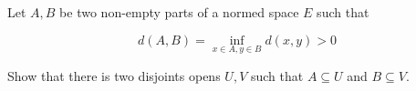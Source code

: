 Let $A, B$ be two non-empty parts of a normed space $E$ such that

\[d(A, B) = \inf_{x\in A, y\in B} d(x, y) > 0\]


Show that there is two disjoints opens $U, V$ such that $A \subseteq U$ and $B \subseteq V$.
